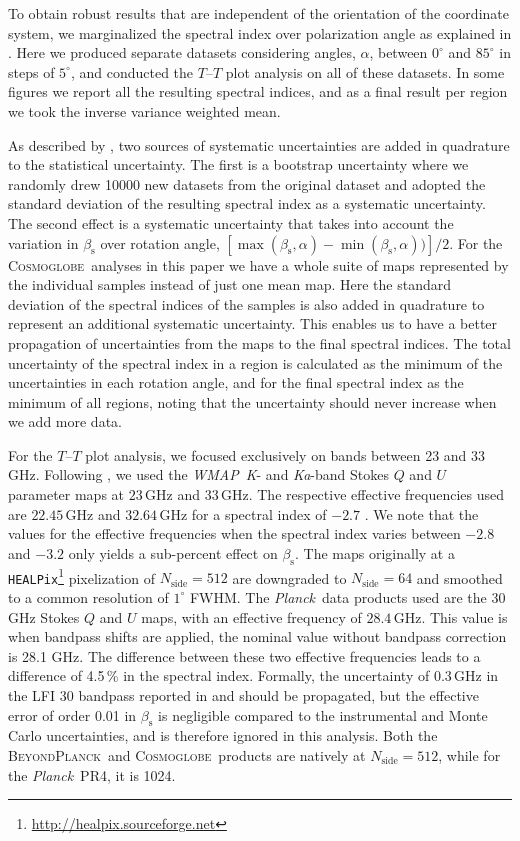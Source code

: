 \documentclass[twocolumn]{../../common/aa}
\def\WMAP{\emph{WMAP}}
\def\Planck{\emph{Planck}}
\def\healpix{\texttt{HEALPix}}
\newcommand{\bp}{\textsc{BeyondPlanck}}
\newcommand{\cosmoglobe}{\textsc{Cosmoglobe}}
\newcommand{\Cosmoglobe}{\textsc{Cosmoglobe}}
\newcommand{\K}[0]{\textit K}
\newcommand{\Ka}[0]{\textit{Ka}}
\begin{document}
To obtain robust results that are independent of the orientation of the coordinate system, we marginalized the spectral index over polarization angle as explained in 
\citet{fuskeland2014,fuskeland:2019}. Here we produced separate datasets considering angles, $\alpha$, between 
$0^\circ$ and $85^\circ$ in steps of $5^\circ$,
and conducted the $T$--$T$ plot analysis on all of these datasets. In some figures we report all the resulting spectral indices, and as a final result per region we took the inverse variance weighted mean. 

As described by \citet{fuskeland:2019}, two sources of systematic uncertainties are added in quadrature to the statistical uncertainty. The first is a bootstrap uncertainty where we randomly drew 10000 new datasets from the original dataset and adopted the standard deviation of the resulting spectral index as a systematic uncertainty. The second effect is a systematic uncertainty that takes into account the variation in $\beta_\mathrm s$ over rotation angle, $[\max(\beta_\mathrm s,\alpha ) - \min(\beta_\mathrm s,\alpha))]/2$. For the \Cosmoglobe\ analyses in this paper we have a whole suite of maps represented by the individual samples instead of just one mean map. Here the standard deviation of the spectral indices of the samples is also added in quadrature to represent an additional systematic uncertainty. This enables us to have a better propagation of uncertainties from the maps to the final spectral indices. The total uncertainty of the spectral index in a region is calculated as the minimum of the uncertainties in each rotation angle, and for the final spectral index as the minimum of all regions, noting that the uncertainty should never increase when we add more data.


For the $T$--$T$ plot  analysis, we focused exclusively on bands between 23 and 33\,GHz. Following \citet{fuskeland2014}, we used the \WMAP\ \K- and \Ka-band Stokes $Q$ and $U$ parameter maps at $23$\,GHz and $33$\,GHz. The respective effective frequencies used are $22.45$\,GHz and $32.64$\,GHz for a spectral index of $-2.7$ \citep{page2003a}. We note that the values for the effective frequencies when the spectral index varies between $-2.8$ and $-3.2$ only yields a sub-percent effect on $\beta_\mathrm{s}$. The maps originally at a \healpix\footnote{\url{http://healpix.sourceforge.net}} pixelization of $N_\textrm{side}=512$ are downgraded to $N_\textrm{side}=64$ and smoothed to a common resolution of $1^\circ$ FWHM.
The \Planck\ data products used are the $30$\,GHz Stokes $Q$ and $U$ maps, with an effective frequency of $28.4$\,GHz. This value is when bandpass shifts are applied, the nominal value without bandpass correction is 28.1 GHz. The difference between these two effective frequencies leads to a difference of 4.5\,\% in the spectral index. Formally, the uncertainty of 0.3\,GHz in the LFI 30 bandpass reported in \citet{bp09} and \citet{watts2023_dr1} should be propagated, but the effective error of order 0.01 in $\beta_\mathrm s$ is negligible compared to the instrumental and Monte Carlo uncertainties, and is therefore ignored in this analysis.
Both the \bp\ and \cosmoglobe\ products are natively at $N_\textrm{side}=512$, while for the \Planck\ PR4, it is 1024.
\end{document}
